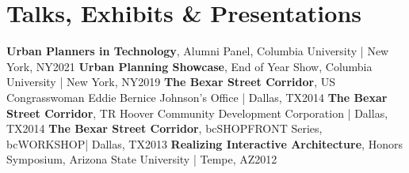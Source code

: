 \documentclass{article}
\begin{document}
    \section*{Talks, Exhibits \& Presentations}
        \textbf{Urban Planners in Technology}, Alumni Panel, Columbia University | New York, NY\hfill{2021}\newline
        \textbf{Urban Planning Showcase}, End of Year Show, Columbia University | New York, NY\hfill{2019}\newline
        \textbf{The Bexar Street Corridor}, US Congrasswoman Eddie Bernice Johnson's Office | Dallas, TX\hfill{2014}\newline
        \textbf{The Bexar Street Corridor}, TR Hoover Community Development Corporation | Dallas, TX\hfill{2014}\newline
        \textbf{The Bexar Street Corridor}, bcSHOPFRONT Series, bcWORKSHOP| Dallas, TX\hfill{2013}\newline
        \textbf{Realizing Interactive Architecture}, Honors Symposium, Arizona State University | Tempe, AZ\hfill{2012}
\end{document}
